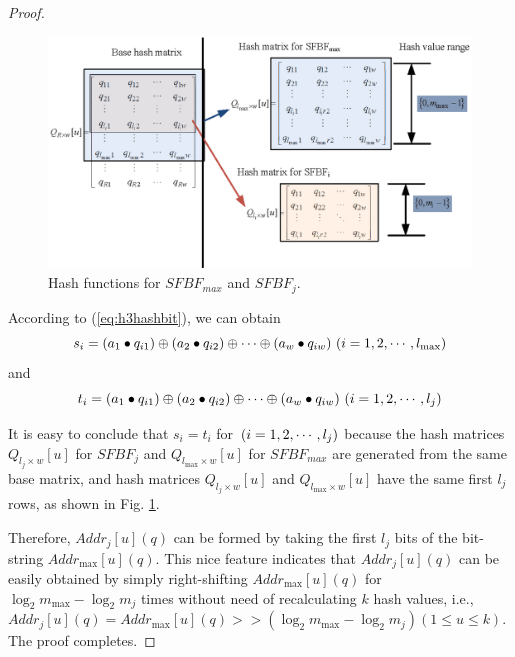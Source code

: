 \documentclass[10pt,journal,compsoc]{IEEEtran}
\newtheorem{proof}{Proof}
\begin{document}
\begin{proof}
\begin{figure}[!h]
\centering
\includegraphics[width=3.6 in]{fig/Different_hash_functions}
\caption{Hash functions for $SFBF_{max}$ and $SFBF_j$.}
\label{fig:Different hash function for different SFBF vectors}
\end{figure}
According to (\ref{eq:h3hashbit}), we can obtain
\begin{equation}
\footnotesize
{s_i} = \left( {{a_1} \bullet {q_{i1}}} \right) \oplus \left( {{a_2} \bullet {q_{i2}}} \right) \oplus  \cdots  \oplus \left( {{a_w} \bullet {q_{iw}}} \right){\rm{   }}\left( {i = 1,2, \cdots ,{l_{\max }}} \right)
\end{equation}
and
\begin{equation}
\footnotesize
{t_i} = \left( {{a_1} \bullet {q_{i1}}} \right) \oplus \left( {{a_2} \bullet {q_{i2}}} \right) \oplus  \cdots  \oplus \left( {{a_w} \bullet {q_{iw}}} \right){\rm{   }}\left( {i = 1,2, \cdots ,{l_j}} \right)
\end{equation}


It is easy to conclude that ${s_i} = {t_i}$ for ${\rm{ }}\left( {i = 1,2, \cdots ,{l_j}} \right)$ because the hash matrices ${Q_{l_j \times w}}\left[ u \right]$ for $SFBF_j$ and ${Q_{{l_{\max }} \times w}}[u]$ for $SFBF_{max}$ are generated from the same base matrix, and hash matrices ${Q_{l_j \times w}}\left[ u \right]$ and ${Q_{{l_{\max }} \times w}}[u]$ have the same first $l_j$ rows, as shown in Fig. \ref{fig:Different hash function for different SFBF vectors}.

Therefore, $Add{r_j}\left[ u \right](q)$ can be formed by taking the first $l_j$ bits of the bit-string $Add{r_{\max }}\left[ u \right](q)$. This nice feature indicates that $Add{r_j}\left[ u \right](q)$ can be easily obtained
by simply right-shifting $Add{r_{\max }}\left[ u \right](q)$ for ${\log _2}{m_{\max }} - {\log _2}{m_j}$ times without need of recalculating $k$ hash values, i.e., $Add{r_j}\left[ u \right](q) = Add{r_{\max }}\left[ u \right] (q)>  >( {\log _2}{m_{\max }} - {\log _2}{m_j})\left( {1 \le u \le k} \right)$. The proof completes.
\end{proof}
\end{document}
